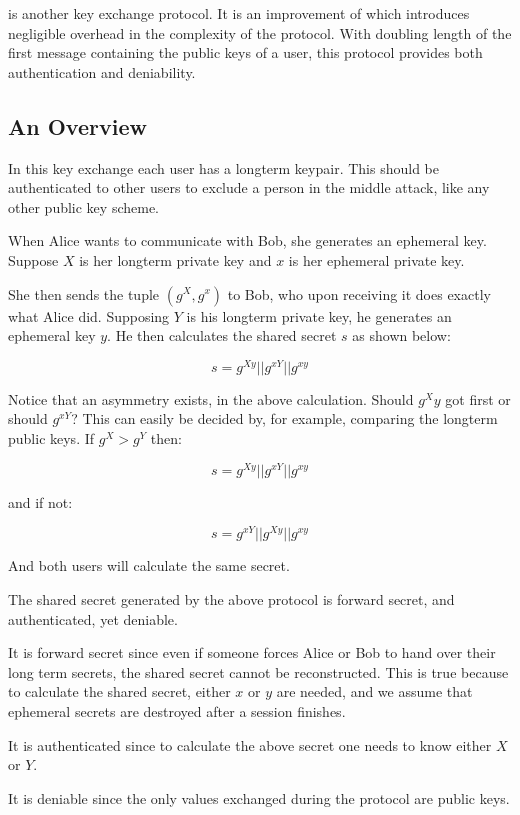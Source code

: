\tdhname is another key exchange protocol.
It is an improvement of \dhname which introduces negligible overhead in the complexity of the protocol.
With doubling length of the first message containing the public keys of a user, this protocol provides both authentication and deniability.

\subsection{An Overview}

In this key exchange each user has a \dhname longterm keypair.
This should be authenticated to other users to exclude a person in the middle attack, like any other public key scheme.

When Alice wants to communicate with Bob, she generates an ephemeral \dhname key.
Suppose $X$ is her longterm private key and $x$ is her ephemeral private key.

She then sends the tuple $(g^X, g^x)$ to Bob, who upon receiving it does exactly what Alice did.
Supposing $Y$ is his longterm private key, he generates an ephemeral key $y$.
He then calculates the shared secret $s$ as shown below:

\[
  s = g^{Xy} || g^{xY} || g^{xy}
\]

Notice that an asymmetry exists, in the above calculation.
Should $g^Xy$ got first or should $g^{xY}$?
This can easily be decided by, for example, comparing the longterm public keys.
If $g^X > g^Y$ then:

\[
  s = g^{Xy} || g^{xY} || g^{xy}
\]

and if not:

\[
  s = g^{xY}|| g^{Xy} || g^{xy}
\]

And both users will calculate the same secret.

The shared secret generated by the above protocol is forward secret, and authenticated, yet deniable.

It is forward secret since even if someone forces Alice or Bob to hand over their long term secrets, the shared secret cannot be reconstructed.
This is true because to calculate the shared secret, either $x$ or $y$ are needed, and we assume that ephemeral secrets are destroyed after a session finishes.

It is authenticated since to calculate the above secret one needs to know either $X$ or $Y$.

It is deniable since the only values exchanged during the protocol are public keys.

